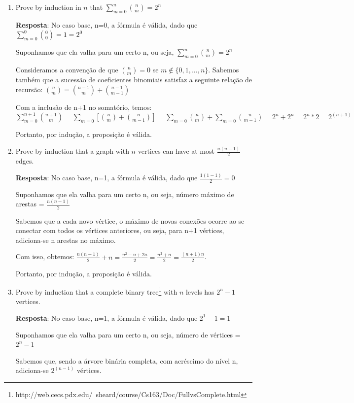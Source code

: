 \documentclass{article}
\begin{document}
\begin{enumerate}
		\item Prove by induction in $n$ that \(\sum_{m=0}^{n}{n \choose m}=2^n\)
		
		\textbf{Resposta}: No caso base, n=0, a fórmula é válida, dado que \(\sum_{m=0}^{0}{0 \choose 0}=1=2^0\)
		
		Suponhamos que ela valha para um certo n, ou seja, \(\sum_{m=0}^{n}{n \choose m}=2^n\)
		
		Consideramos a convenção de que 
		${n \choose m} = 0$ se 
		$m \notin \{0,1,...,n\}$. Sabemos também que a sucessão de coeficientes binomiais satisfaz a seguinte relação de recursão: 
		\({n \choose m} = {n-1 \choose m} + {n-1 \choose m-1}\)
		
		Com a inclusão de n+1 no somatório, temos: 
		\(\sum_{m=0}^{n+1}{n+1 \choose m} = \sum_{m=0}^{}[{n \choose m} + {n \choose m-1}] = \sum_{m=0}^{}{n \choose m} + \sum_{m=0}^{}{n \choose m-1} = 2^n + 2^n = 2^n*2 = 2^{(n+1)}\)
		
		Portanto, por indução, a proposição é válida.
		
		\item Prove by induction that a graph with $n$ vertices can have at most  $\frac{n(n-1)}{2}$ edges.
		
		\textbf{Resposta}: 
		No caso base, n=1, a fórmula é válida, dado que $\frac{1(1-1)}{2} = 0$
		
		Suponhamos que ela valha para um certo n, ou seja, número máximo de arestas =  
		$\frac{n(n-1)}{2}$
		
		Sabemos que a cada novo vértice, o máximo de novas conexões ocorre ao se conectar com todos os vértices anteriores, ou seja, para n+1 vértices, adiciona-se n arestas no máximo.
		
		Com isso, obtemos: $\frac{n(n-1)}{2} + n = \frac{n^2 - n + 2n}{2} = \frac{n^2 + n}{2} = \frac{(n+1)n}{2}$. 
		
		Portanto, por indução, a proposição é válida.
		
		
		\item Prove by induction that a complete binary tree\footnote{http://web.cecs.pdx.edu/~sheard/course/Cs163/Doc/FullvsComplete.html} with $n$ levels has $2^n-1$ vertices.
		
		\textbf{Resposta}: 
		No caso base, n=1, a fórmula é válida, dado que $2^1-1 = 1$
		
		Suponhamos que ela valha para um certo n, ou seja, número de vértices =  
		$2^n-1$
		
		Sabemos que, sendo a árvore binária completa, com acréscimo do nível n, adiciona-se $2^{(n-1)}$ vértices.
		

\end{enumerate}
\end{document}
